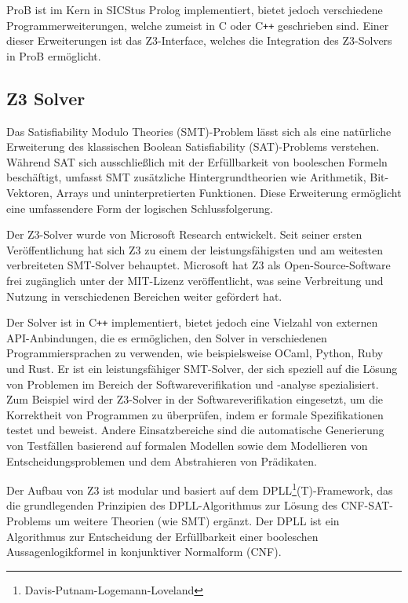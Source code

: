 ProB ist im Kern in SICStus Prolog \cite{carlsson1988sicstus} implementiert, bietet jedoch verschiedene Programmerweiterungen, welche zumeist in C oder C\texttt{++} geschrieben sind.
Einer dieser Erweiterungen ist das Z3-Interface, welches die Integration des Z3-Solvers in ProB ermöglicht.

\subsection{Z3 Solver}

Das Satisfiability Modulo Theories (SMT)-Problem lässt sich als eine natürliche Erweiterung des klassischen Boolean Satisfiability (SAT)-Problems verstehen.
Während SAT sich ausschließlich mit der Erfüllbarkeit von booleschen Formeln beschäftigt,
umfasst SMT zusätzliche Hintergrundtheorien wie Arithmetik, Bit-Vektoren, Arrays und uninterpretierten Funktionen.
Diese Erweiterung ermöglicht eine umfassendere Form der logischen Schlussfolgerung.

Der Z3-Solver \cite{10.1007/978-3-540-78800-3_24} wurde von Microsoft Research entwickelt.
Seit seiner ersten Veröffentlichung hat sich Z3 zu einem der leistungsfähigsten und am weitesten verbreiteten SMT-Solver behauptet.
Microsoft hat Z3 als Open-Source-Software frei zugänglich unter der MIT-Lizenz veröffentlicht,
was seine Verbreitung und Nutzung in verschiedenen Bereichen weiter gefördert hat.

Der Solver ist in C\texttt{++} implementiert, bietet jedoch eine Vielzahl von externen API-Anbindungen, die es ermöglichen, den Solver in verschiedenen Programmiersprachen zu verwenden,
wie beispielsweise OCaml, Python, Ruby und Rust.
Er ist ein leistungsfähiger SMT-Solver, der sich speziell auf die Lösung von Problemen im Bereich der Softwareverifikation und -analyse spezialisiert.
Zum Beispiel wird der Z3-Solver in der Softwareverifikation eingesetzt, um die Korrektheit von Programmen zu überprüfen, indem er formale Spezifikationen testet und beweist.
Andere Einsatzbereiche sind die automatische Generierung von Testfällen basierend auf formalen Modellen sowie dem Modellieren von Entscheidungsproblemen und dem Abstrahieren von Prädikaten.

Der Aufbau von Z3 ist modular und basiert auf dem DPLL\footnote{Davis-Putnam-Logemann-Loveland}(T)-Framework,
das die grundlegenden Prinzipien des DPLL-Algorithmus zur Lösung des CNF-SAT-Problems um weitere Theorien (wie SMT) ergänzt.
Der DPLL ist ein Algorithmus zur Entscheidung der Erfüllbarkeit einer booleschen Aussagenlogikformel in konjunktiver Normalform (CNF).

